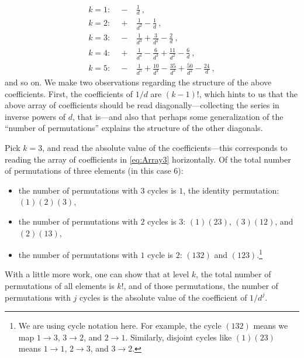 \documentclass[a4paper,11pt]{article}
\begin{document}
\begin{align}
\nonumber k=1 : \quad -&\frac{1}{d} \ , \\
\nonumber k=2 : \quad +&\frac{1}{d^2} - \frac{1}{d} \ , \\
\label{eq:Array3}
k=3 : \quad -&\frac{1}{d^3} + \frac{3}{d^2} - \frac{2}{d}\ , \\
\nonumber k=4 : \quad +&\frac{1}{d^4} - \frac{6}{d^3} + \frac{11}{d^2} - \frac{6}{d} \ , \\
\nonumber k=5 : \quad -&\frac{1}{d^5} + \frac{10}{d^4} - \frac{35}{d^3} + \frac{50}{d^2} - \frac{24}{d} \ ,
\end{align}
and so on. We make two observations regarding the structure of the above coefficients. First, the coefficients of $1/d$ are $(k-1)!$, which hints to us that the above array of coefficients should be read diagonally---collecting the series in inverse powers of $d$, that is---and also that perhaps some generalization of the ``number of permutations'' explains the structure of the other diagonals.

Pick $k = 3$, and read the absolute value of the coefficients---this corresponds to reading the array of coefficients in \eqref{eq:Array3} horizontally. Of the total number of permutations of three elements (in this case $6$):
\begin{itemize}
    \item the number of permutations with $3$ cycles is $1$, the identity permutation: $(1)(2)(3)$,
    \item the number of permutations with $2$ cycles is $3$: $(1)(23)$, $(3)(12)$, and $(2)(13)$,
    \item the number of permutations with $1$ cycle is $2$: $(132)$ and $(123)$.\footnote{We are using cycle notation here. For example, the cycle $(132)$ means we map $1 \rightarrow 3$, $3 \rightarrow 2$, and $2 \rightarrow 1$. Similarly, disjoint cycles like $(1)(23)$ means $1 \rightarrow 1$, $2 \rightarrow 3$, and $3 \rightarrow 2$.}
\end{itemize}
With a little more work, one can show that at level $k$, the total number of permutations of all elements is $k!$, and of those permutations, the number of permutations with $j$ cycles is the absolute value of the coefficient of $1/d^j$.
\end{document}
